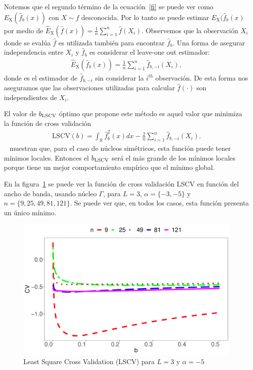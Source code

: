 Notemos que el segundo término de la ecuación~\eqref{fi} se puede ver como $E_\text{X}(\widehat{f}_b(x))$ con $X \sim f$ desconocida. Por lo tanto se puede estimar $E_\text{X}(\widehat{f}_b(x)$ por medio de $\widehat{E}_\text{X}(\widehat{f}(x))=\frac{1}{n}\sum_{i=1}^n \widehat{f}(X_i)$. Observemos que la observación $X_i$ donde se evalúa $\widehat{f}$ es utilizada también para encontrar $\widehat{f}_b$. Una forma de asegurar independencia entre $X_i$ y  $\widehat{f}_b$ es considerar el leave-one out estimador:
\begin{align}
\widehat{E}_\text{X}(\widehat{f}_b(x))=\frac{1}{n}\sum_{i=1}^n \widehat{f}_{b,-i}(X_i),
\end{align}	
donde  es el estimador de $\widehat{f}_{b,-i}$ sin considerar la $i^{th}$ observación. De esta forma nos aseguramos que las observaciones utilizadas para calcular  $\widehat{f}(\cdot)$ son independientes de $X_i.$

El valor de $b_{\tiny \text{LSCV}}$ óptimo que propone este método es aquel valor que minimiza la función de cross validación 
\begin{align}
\label{LSCV}
\text{LSCV}(b)=\int_\mathbb{R} \widehat{f}_b^2(x)dx - \frac{2}{n}\sum_{i=1}^n \widehat{f}_{b,-i}(X_i).
\end{align}
~\citet{HallMarron1991} muestran que, para el caso de núcleos simétricos, esta función puede tener mínimos locales. Entonces el  $b_{\tiny \text{LSCV}}$ será el más grande de los mínimos locales porque tiene un mejor comportamiento empírico que el mínimo global.

En la figura~\ref{LSCVgraf} se puede ver la función de cross validación LSCV en función del ancho de banda, usando núcleo $\Gamma$, para $L=3$, $\alpha=\{-3,-5\}$ y $n=\{9,25,49,81,121\}$. Se puede ver que, en todos los casos, esta función presenta un único mínimo.

\begin{figure}[hbt]
	\centering 
	\includegraphics[scale=0.5]{../../Figures/Tesis/Capitulo5/GraficoLSCValfa=-5.pdf}
	\caption{\label{LSCVgraf} Least Square Cross Validation (LSCV) para $L=3$ y $\alpha=-5$}
\end{figure}

